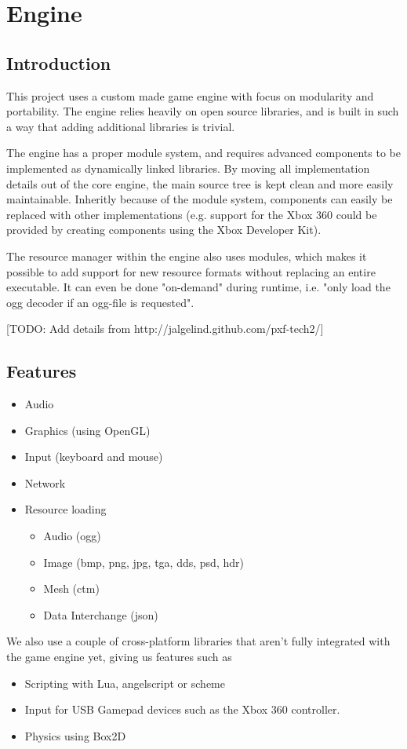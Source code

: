 
\chapter{Engine}
\section{Introduction}
This project uses a custom made game engine with focus on modularity and portability. The engine relies heavily on open source libraries, and is built in such a way that adding additional libraries is trivial.

The engine has a proper module system, and requires advanced components to be implemented as dynamically linked libraries. By moving all implementation details out of the core engine, the main source tree is kept clean and more easily maintainable. Inheritly because of the module system, components can easily be replaced with other implementations (e.g. support for the Xbox 360 could be provided
by creating components using the Xbox Developer Kit).

The resource manager within the engine also uses modules, which makes it possible to add support for new resource formats without replacing an entire executable. It can even
be done "on-demand" during runtime, i.e. "only load the ogg decoder if an ogg-file is requested".


[TODO: Add details from http://jalgelind.github.com/pxf-tech2/]

 \section{Features}
 \begin{itemize}
 \item Audio
 \item Graphics (using OpenGL)
 \item Input (keyboard and mouse)
 \item Network
 \item Resource loading
 	\begin{itemize}
 		\item Audio (ogg)
 		\item Image (bmp, png, jpg, tga, dds, psd, hdr)
 		\item Mesh (ctm)
 		\item Data Interchange (json)
 	\end{itemize}
 \end{itemize}

We also use a couple of cross-platform libraries that aren't fully integrated with the game engine yet, giving us features such as
\begin{itemize}
\item Scripting with Lua, angelscript or scheme
\item Input for USB Gamepad devices such as the Xbox 360 controller.
\item Physics using Box2D
\end{itemize}

